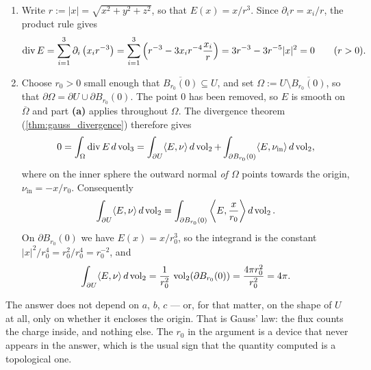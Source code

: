\begin{exercisesolution}
\label{sol:gauss_law_ellipsoid_flux}
\begin{enumerate}[label=\textbf{(\alph*)}]
  \item Write $r := \lvert x\rvert = \sqrt{x^2+y^2+z^2}$, so that $E(x) = x/r^3$. Since
    $\partial_i r = x_i/r$, the product rule gives
\[\operatorname{div} E = \sum_{i=1}^3 \partial_i \left(x_i r^{-3}\right) = \sum_{i=1}^3 \left(r^{-3} - 3 x_i r^{-4} \frac{x_i}{r}\right) = 3r^{-3} - 3r^{-5} \lvert x\rvert^2 = 0 \qquad (r > 0).\]

  \item Choose $r_0 > 0$ small enough that $\overline{B_{r_0}(0)} \subseteq U$, and set
    $\Omega := U \setminus \overline{B_{r_0}(0)}$, so that $\partial \Omega = \partial U \cup \partial B_{r_0}(0)$.
    The point $0$ has been removed, so $E$ is smooth on $\overline{\Omega}$ and part \textbf{(a)}
    applies throughout $\Omega$. The divergence theorem (\cref{thm:gauss_divergence}) therefore gives
\[0 = \int_\Omega \operatorname{div} E \, d\operatorname{vol}_3 = \int_{\partial U} \langle E,\nu\rangle \, d\operatorname{vol}_2 + \int_{\partial B_{r_0}(0)} \langle E,\nu_{\mathrm{in}}\rangle \, d\operatorname{vol}_2,\]
    where on the inner sphere the outward normal \emph{of $\Omega$} points towards the origin,
    $\nu_{\mathrm{in}} = -x/r_0$. Consequently
\[\int_{\partial U} \langle E,\nu\rangle \, d\operatorname{vol}_2 = \int_{\partial B_{r_0}(0)} \left\langle E, \frac{x}{r_0}\right\rangle d\operatorname{vol}_2 .\]
    On $\partial B_{r_0}(0)$ we have $E(x) = x/r_0^3$, so the integrand is the constant
    $\lvert x\rvert^2/r_0^4 = r_0^2/r_0^4 = r_0^{-2}$, and
\[\int_{\partial U} \langle E,\nu\rangle \, d\operatorname{vol}_2 = \frac{1}{r_0^2}\,\operatorname{vol}_2(\partial B_{r_0}(0)) = \frac{4\pi r_0^2}{r_0^2} = 4\pi.\]
\end{enumerate}
\begin{remark}
The answer does not depend on $a$, $b$, $c$ --- or, for that matter, on the shape of $U$ at all,
only on whether it encloses the origin. That is Gauss' law: the flux counts the charge inside, and
nothing else. The $r_0$ in the argument is a device that never appears in the answer, which is the
usual sign that the quantity computed is a topological one.
\end{remark}
\end{exercisesolution}

